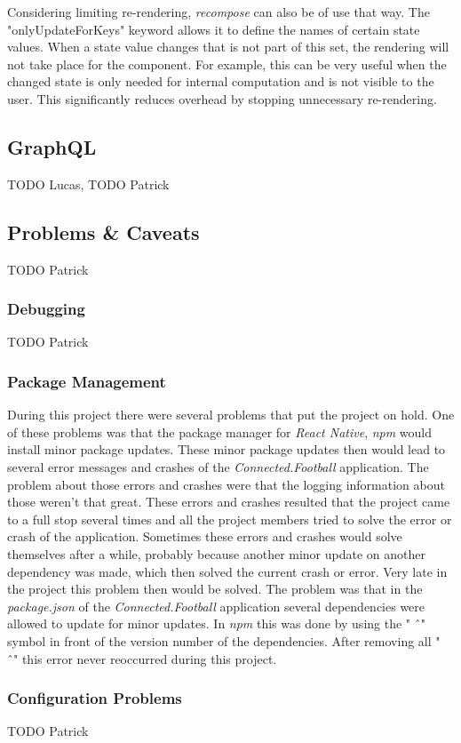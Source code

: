 \newline
Considering limiting re-rendering, \textit{recompose} can also be of use that way. The "onlyUpdateForKeys" keyword allows it to define the names of certain state values. When a state value changes that is not part of this set, the rendering will not take place for the component. For example, this can be very useful when the changed state is only needed for internal computation and is not visible to the user. This significantly reduces overhead by stopping unnecessary re-rendering.

\subsection{GraphQL}
\label{ssec:graphql}

TODO Lucas, TODO Patrick

\subsection{Problems \& Caveats}
\label{ssec:problems}

TODO Patrick

\subsubsection{Debugging}
\label{sssec:debugging}

TODO Patrick

\subsubsection{Package Management}
\label{sssec:package_management}

During this project there were several problems that put the project on hold. One of these problems was that the package manager for \textit{React Native}, \textit{npm} would install minor package updates. These minor package updates then would lead to several error messages and crashes of the \textit{Connected.Football} application. The problem about those errors and crashes were that the logging information about those weren't that great. These errors and crashes resulted that the project came to a full stop several times and all the project members tried to solve the error or crash of the application. 
\newline
Sometimes these errors and crashes would solve themselves after a while, probably because another minor update on another dependency was made, which then solved the current crash or error. 
\newline
Very late in the project this problem then would be solved. The problem was that in the \textit{package.json} of the \textit{Connected.Football} application several dependencies were allowed to update for minor updates. In \textit{npm} this was done by using the " \^\ " symbol in front of the version number of the dependencies. After removing all " \^\ " this error never reoccurred during this project. 

\subsubsection{Configuration Problems}
\label{sssec:configuration_problems}

TODO Patrick